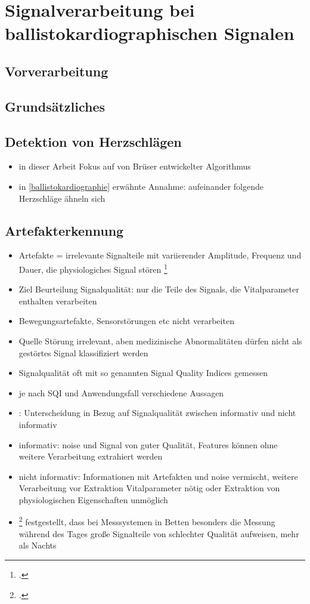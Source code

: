 \chapter{Signalverarbeitung bei ballistokardiographischen Signalen}

\section{Vorverarbeitung}

\section{Grundsätzliches}

\section{Detektion von Herzschlägen}

	\begin{itemize}
		\item in dieser Arbeit Fokus auf von Brüser entwickelter Algorithmus
		\item in \ref{ballistokardiographie} erwähnte Annahme: aufeinander folgende Herzschläge ähneln sich
	\end{itemize}

\section{Artefakterkennung}

	\begin{itemize}
		\item Artefakte = irrelevante Signalteile mit variierender Amplitude, Frequenz und Dauer, die physiologiches Signal stören \footcite{Nizami2013}
		\item Ziel Beurteilung Signalqualität: nur die Teile des Signals, die Vitalparameter enthalten verarbeiten
		\item Bewegungsartefakte, Sensorstörungen etc nicht verarbeiten
		\item Quelle Störung irrelevant, aben medizinische Abnormalitäten dürfen nicht als gestörtes Signal klassifiziert werden
		\item Signalqualität oft mit so genannten Signal Quality Indices gemessen
		\item je nach SQI und Anwendungsfall verschiedene Aussagen
		\item \citeauthor{Sadek2016}: Unterscheidung in Bezug auf Signalqualität zwischen informativ und nicht informativ
		\item informativ: noise und Signal von guter Qualität, Features können ohne weitere Verarbeitung extrahiert werden
		\item nicht informativ: Informationen mit Artefakten und noise vermischt, weitere Verarbeitung vor Extraktion Vitalparameter nötig oder Extraktion von physiologischen Eigenschaften unmöglich
		\item \footcite{HoogAntink2020} festgestellt, dass bei Messsystemen in Betten besonders die Messung während des Tages große Signalteile von schlechter Qualität aufweisen, mehr als Nachts

	\end{itemize}

